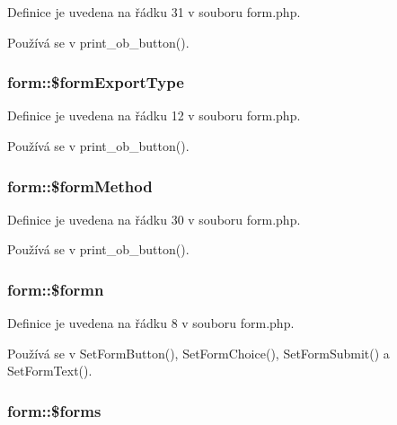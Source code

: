 Definice je uvedena na řádku 31 v souboru form.\-php.



Používá se v print\-\_\-ob\-\_\-button().

\hypertarget{classform_a2c8a508c5fd3f4ddecda3f3b1cf34aa3}{
\subsubsection[{\$form\-Export\-Type}]{\setlength{\rightskip}{0pt plus 5cm}form\-::\$form\-Export\-Type}}\label{classform_a2c8a508c5fd3f4ddecda3f3b1cf34aa3}


Definice je uvedena na řádku 12 v souboru form.\-php.



Používá se v print\-\_\-ob\-\_\-button().

\hypertarget{classform_a1794de12abbbf034b0848b87e7105094}{
\subsubsection[{\$form\-Method}]{\setlength{\rightskip}{0pt plus 5cm}form\-::\$form\-Method}}\label{classform_a1794de12abbbf034b0848b87e7105094}


Definice je uvedena na řádku 30 v souboru form.\-php.



Používá se v print\-\_\-ob\-\_\-button().

\hypertarget{classform_aed1ff4c0500b4cc1b40a6f14f1b977b5}{
\subsubsection[{\$formn}]{\setlength{\rightskip}{0pt plus 5cm}form\-::\$formn}}\label{classform_aed1ff4c0500b4cc1b40a6f14f1b977b5}


Definice je uvedena na řádku 8 v souboru form.\-php.



Používá se v Set\-Form\-Button(), Set\-Form\-Choice(), Set\-Form\-Submit() a Set\-Form\-Text().

\hypertarget{classform_a05d71686cc8461bf72fb9abb5b7588d1}{
\subsubsection[{\$forms}]{\setlength{\rightskip}{0pt plus 5cm}form\-::\$forms}}\label{classform_a05d71686cc8461bf72fb9abb5b7588d1}


